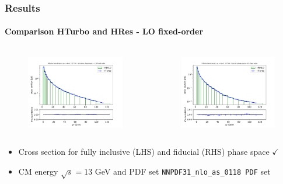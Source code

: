 \documentclass[aspectratio=43]{beamer}
\begin{document}
\begin{frame}

	\frametitle{Results}
	\framesubtitle{Comparison HTurbo and HRes - LO fixed-order}
	
	\footnotesize
	
	\begin{columns}
		
		
		\begin{figure}
			\includegraphics[width = 7cm]{plots/part3/chapter6/nlo-fo-1.png}
		\end{figure}
		
		
		\begin{figure}
			\includegraphics[width = 7cm]{plots/part3/chapter6/nlo-fo-fid-1.png}
		\end{figure}
		
	\end{columns}
	
	\begin{itemize}
		\item Cross section for fully inclusive (LHS) and fiducial (RHS) phase space {\color{darkgreen}$\checkmark$} 
		\item CM energy $\sqrt s = 13$ GeV and PDF set \texttt{NNPDF31\_nlo\_as\_0118 PDF} set
	\end{itemize}

\end{frame}
\end{document}
